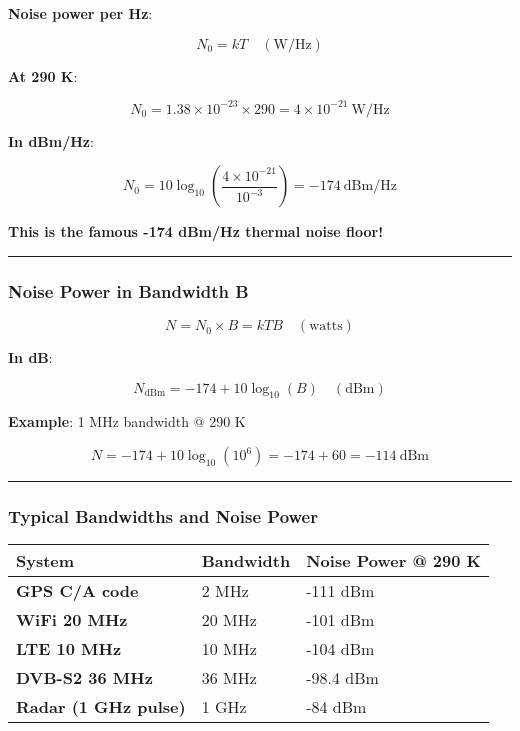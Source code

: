 \textbf{Noise power per Hz}:

\[
N_0 = k T \quad (\text{W/Hz})
\]

\textbf{At 290 K}:

\[
N_0 = 1.38 \times 10^{-23} \times 290 = 4 \times 10^{-21}\ \text{W/Hz}
\]

\textbf{In dBm/Hz}:

\[
N_0 = 10\log_{10}\left(\frac{4 \times 10^{-21}}{10^{-3}}\right) = -174\ \text{dBm/Hz}
\]

\textbf{This is the famous -174 dBm/Hz thermal noise floor!}

\begin{center}\rule{0.5\linewidth}{0.5pt}\end{center}

\subsubsection{Noise Power in Bandwidth
B}\label{noise-power-in-bandwidth-b}

\[
N = N_0 \times B = kTB \quad (\text{watts})
\]

\textbf{In dB}:

\[
N_{\text{dBm}} = -174 + 10\log_{10}(B) \quad (\text{dBm})
\]

\textbf{Example}: 1 MHz bandwidth @ 290 K

\[
N = -174 + 10\log_{10}(10^6) = -174 + 60 = -114\ \text{dBm}
\]

\begin{center}\rule{0.5\linewidth}{0.5pt}\end{center}

\subsubsection{Typical Bandwidths and Noise
Power}\label{typical-bandwidths-and-noise-power}

{\def\LTcaptype{} %
\begin{longtable}[]{@{}lll@{}}
\toprule\noalign{}
System & Bandwidth & Noise Power @ 290 K \\
\midrule\noalign{}
\endhead
\bottomrule\noalign{}
\endlastfoot
\textbf{GPS C/A code} & 2 MHz & -111 dBm \\
\textbf{WiFi 20 MHz} & 20 MHz & -101 dBm \\
\textbf{LTE 10 MHz} & 10 MHz & -104 dBm \\
\textbf{DVB-S2 36 MHz} & 36 MHz & -98.4 dBm \\
\textbf{Radar (1 GHz pulse)} & 1 GHz & -84 dBm \\
\end{longtable}
}

